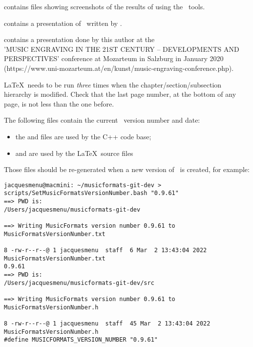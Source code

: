  contains  files showing screenshots of the results of using the \mf\ tools. %

 contains a presentation of \libmusicxml\ written by \fober.

 contains a presentation done by this author at the \\
'MUSIC ENGRAVING IN THE 21ST CENTURY -- DEVELOPMENTS AND PERSPECTIVES' conference at Mozarteum in Salzburg in January 2020 (https://www.uni-mozarteum.at/en/kunst/music-engraving-conference.php).


\LaTeX\ needs to be run {\it three} times when the chapter/section/subsection hierarchy is modified. Check that the last page number, at the bottom of any page, is not less than the one before.

The following files contain the current \mf\ version number and date:
\begin{itemize}
\item the  and  files are used by the C++ code base;
\item {} and  are used by the \LaTeX\ source files
\end{itemize}
Those files should be re-generated when a new version of \mf\ is created, for example:
\begin{lstlisting}[language=Terminal]
jacquesmenu@macmini: ~/musicformats-git-dev > scripts/SetMusicFormatsVersionNumber.bash "0.9.61"
==> PWD is:
/Users/jacquesmenu/musicformats-git-dev

==> Writing MusicFormats version number 0.9.61 to MusicFormatsVersionNumber.txt

8 -rw-r--r--@ 1 jacquesmenu  staff  6 Mar  2 13:43:04 2022 MusicFormatsVersionNumber.txt
0.9.61
==> PWD is:
/Users/jacquesmenu/musicformats-git-dev/src

==> Writing MusicFormats version number 0.9.61 to MusicFormatsVersionNumber.h

8 -rw-r--r--@ 1 jacquesmenu  staff  45 Mar  2 13:43:04 2022 MusicFormatsVersionNumber.h
#define MUSICFORMATS_VERSION_NUMBER "0.9.61"
\end{lstlisting}

